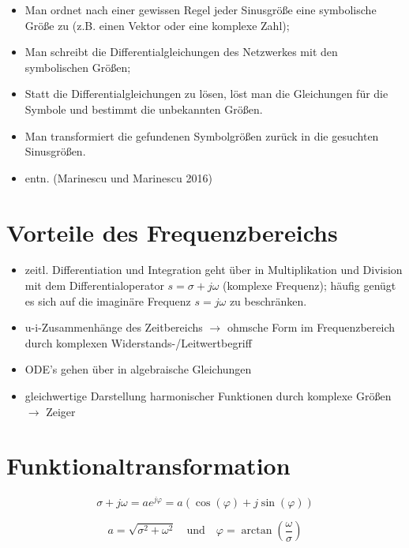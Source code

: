 \documentclass[
  ngerman,
  letterpaper,
]{scrbook}
\begin{document}
\begin{itemize}
\item
  Man ordnet nach einer gewissen Regel jeder Sinusgröße eine symbolische
  Größe zu (z.B. einen Vektor oder eine komplexe Zahl);
\item
  Man schreibt die Differentialgleichungen des Netzwerkes mit den
  symbolischen Größen;
\item
  Statt die Differentialgleichungen zu lösen, löst man die Gleichungen
  für die Symbole und bestimmt die unbekannten Größen.
\item
  Man transformiert die gefundenen Symbolgrößen zurück in die gesuchten
  Sinusgrößen.
\item
  entn. (Marinescu und Marinescu 2016)
\end{itemize}

\section{Vorteile des
Frequenzbereichs}\label{vorteile-des-frequenzbereichs}

\begin{itemize}
\item
  zeitl. Differentiation und Integration geht über in Multiplikation und
  Division mit dem Differentialoperator \(s=\sigma+j\omega\) (komplexe
  Frequenz); häufig genügt es sich auf die imaginäre Frequenz
  \(s=j \omega\) zu beschränken.
\item
  u-i-Zusammenhänge des Zeitbereichs \(\rightarrow\) ohmsche Form im
  Frequenzbereich durch komplexen Widerstands-/Leitwertbegriff
\item
  ODE's gehen über in algebraische Gleichungen
\item
  gleichwertige Darstellung harmonischer Funktionen durch komplexe
  Größen \(\rightarrow\) Zeiger
\end{itemize}

\section{Funktionaltransformation}\label{funktionaltransformation}

\begin{tcolorbox}[enhanced jigsaw, titlerule=0mm, rightrule=.15mm, toprule=.15mm, colback=white, toptitle=1mm, bottomrule=.15mm, coltitle=black, leftrule=.75mm, arc=.35mm, colbacktitle=quarto-callout-note-color!10!white, opacityback=0, bottomtitle=1mm, colframe=quarto-callout-note-color-frame, opacitybacktitle=0.6, breakable, title=\textcolor{quarto-callout-note-color}{\faInfo}\hspace{0.5em}{Euler'sche Formel}, left=2mm]

\[
\sigma + j \omega = a e^{j \varphi} = a \left( \cos(\varphi) + j \sin(\varphi) \right) 
\]

\[
a = \sqrt{\sigma^2 + \omega^2} \quad \mbox{und} \quad \varphi = \arctan\left(\frac{\omega}{\sigma}\right)
\]

\end{tcolorbox}
\end{document}
